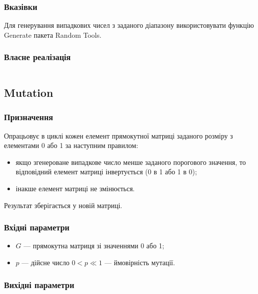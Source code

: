 \documentclass[a4paper, 12pt]{article}
\numberwithin{equation}{section}
\begin{document}
\subsubsection*{Вказівки}

Для генерування випадкових чисел з заданого діапазону використовувати функцію Generate пакета Random Tools.

\subsubsection*{Власне реалізація}

\inputminted[firstline=7, lastline=40]{python}{../code/generation_dec.py}

\subsection{Mutation}

\subsubsection*{Призначення}

Опрацьовує в циклі кожен елемент прямокутної матриці заданого розміру з елементами 0 або 1 за наступним правилом: 
\begin{itemize}
    \item якщо згенероване випадкове число менше заданого порогового значення, то відповідний елемент матриці інвертується (0 в 1 або 1 в 0);
    \item інакше елемент матриці не змінюється. 
\end{itemize}

Результат зберігається у новій матриці.

\subsubsection*{Вхідні параметри}

\begin{itemize}
    \item $G$ --- прямокутна матриця зі значеннями 0 або 1;
    \item $p$ --- дійсне число $0 < p \ll 1$ --- ймовірність мутації.
\end{itemize}

\subsubsection*{Вихідні параметри}
\end{document}
